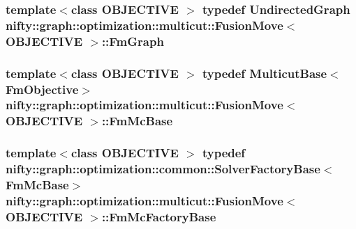 \subsubsection[{Fm\+Graph}]{\setlength{\rightskip}{0pt plus 5cm}template$<$class O\+B\+J\+E\+C\+T\+I\+V\+E $>$ typedef {\bf Undirected\+Graph} {\bf nifty\+::graph\+::optimization\+::multicut\+::\+Fusion\+Move}$<$ O\+B\+J\+E\+C\+T\+I\+V\+E $>$\+::{\bf Fm\+Graph}}\label{classnifty_1_1graph_1_1optimization_1_1multicut_1_1FusionMove_a2bf067e2ddf02a5d392ec4249c47f3f6}
\hypertarget{classnifty_1_1graph_1_1optimization_1_1multicut_1_1FusionMove_a045052b4501006843db153fbefc62cdc}{}
\subsubsection[{Fm\+Mc\+Base}]{\setlength{\rightskip}{0pt plus 5cm}template$<$class O\+B\+J\+E\+C\+T\+I\+V\+E $>$ typedef {\bf Multicut\+Base}$<${\bf Fm\+Objective}$>$ {\bf nifty\+::graph\+::optimization\+::multicut\+::\+Fusion\+Move}$<$ O\+B\+J\+E\+C\+T\+I\+V\+E $>$\+::{\bf Fm\+Mc\+Base}}\label{classnifty_1_1graph_1_1optimization_1_1multicut_1_1FusionMove_a045052b4501006843db153fbefc62cdc}
\hypertarget{classnifty_1_1graph_1_1optimization_1_1multicut_1_1FusionMove_a5c77d3bdf410275f9488c2e6dc2f7392}{}
\subsubsection[{Fm\+Mc\+Factory\+Base}]{\setlength{\rightskip}{0pt plus 5cm}template$<$class O\+B\+J\+E\+C\+T\+I\+V\+E $>$ typedef {\bf nifty\+::graph\+::optimization\+::common\+::\+Solver\+Factory\+Base}$<${\bf Fm\+Mc\+Base}$>$ {\bf nifty\+::graph\+::optimization\+::multicut\+::\+Fusion\+Move}$<$ O\+B\+J\+E\+C\+T\+I\+V\+E $>$\+::{\bf Fm\+Mc\+Factory\+Base}}\label{classnifty_1_1graph_1_1optimization_1_1multicut_1_1FusionMove_a5c77d3bdf410275f9488c2e6dc2f7392}
\hypertarget{classnifty_1_1graph_1_1optimization_1_1multicut_1_1FusionMove_a283c909a0176f78b4ad7ad56c2dfcff2}{}
